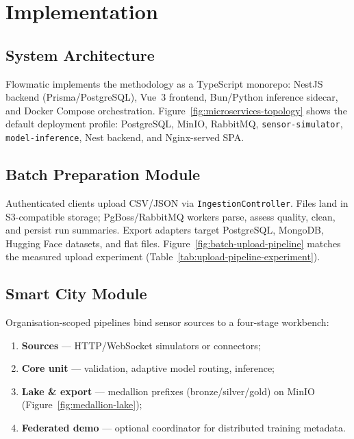 %
%

\chapter{Implementation}
\label{chap:implementation}

\section{System Architecture}

Flowmatic implements the methodology as a TypeScript monorepo: NestJS backend (Prisma/PostgreSQL), Vue~3 frontend, Bun/Python inference sidecar, and Docker Compose orchestration. Figure~\ref{fig:microservices-topology} shows the default deployment profile: PostgreSQL, MinIO, RabbitMQ, \texttt{sensor-simulator}, \texttt{model-inference}, Nest backend, and Nginx-served SPA.

\section{Batch Preparation Module}

Authenticated clients upload CSV/JSON via \texttt{IngestionController}. Files land in S3-compatible storage; PgBoss/RabbitMQ workers parse, assess quality, clean, and persist run summaries. Export adapters target PostgreSQL, MongoDB, Hugging Face datasets, and flat files. Figure~\ref{fig:batch-upload-pipeline} matches the measured upload experiment (Table~\ref{tab:upload-pipeline-experiment}).

\section{Smart City Module}

Organisation-scoped pipelines bind sensor sources to a four-stage workbench:
\begin{enumerate}
  \item \textbf{Sources} --- HTTP/WebSocket simulators or connectors;
  \item \textbf{Core unit} --- validation, adaptive model routing, inference;
  \item \textbf{Lake \& export} --- medallion prefixes (bronze/silver/gold) on MinIO (Figure~\ref{fig:medallion-lake});
  \item \textbf{Federated demo} --- optional coordinator for distributed training metadata.
\end{enumerate}

